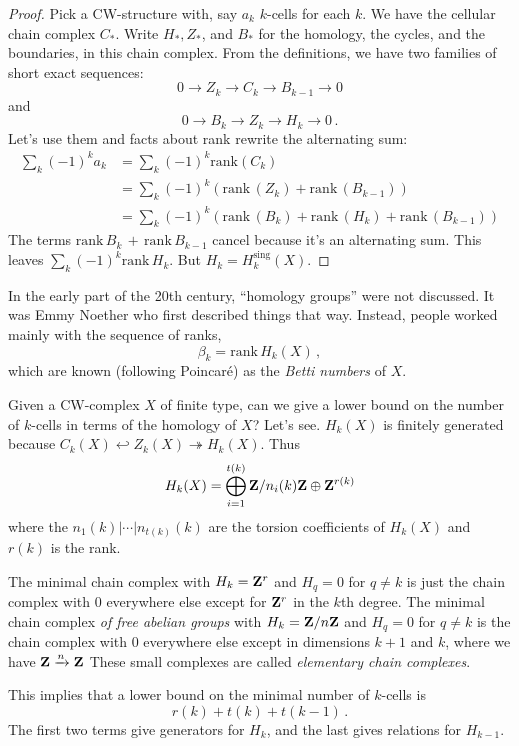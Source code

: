 \begin{proof}
Pick a CW-structure with, say $a_k$ $k$-cells for each $k$. We have the 
cellular chain complex $C_*$. Write $H_*,Z_*$, and $B_*$ for the homology,
the cycles, and the boundaries, in this chain complex. From the definitions, 
we have two families of short exact sequences: 
\[
0\to Z_k\to C_k\to B_{k-1}\to 0
\]
and
\[
0\to B_k\to Z_k\to H_k\to 0\,.
\]
Let's use them and facts about rank rewrite the alternating sum:
\begin{align*}
\sum_k (-1)^ka_k & = \sum_k(-1)^k\mathrm{rank}(C_k)\\
& = \sum_k(-1)^k(\mathrm{rank}\,(Z_k)+\mathrm{rank}\,(B_{k-1}))\\
& = \sum_k(-1)^k(\mathrm{rank}\,(B_k)+\mathrm{rank}\,(H_k)+
\mathrm{rank}\,(B_{k-1}))
\end{align*}
The terms $\mathrm{rank}\,B_k\,+\,\mathrm{rank}\,B_{k-1}$ cancel because it's an alternating sum. This leaves $\sum_k(-1)^k\mathrm{rank}\,H_k$. But $H_k= H_k^\text{sing}(X)$.
\end{proof}

In the early part of the 20th century, ``homology groups'' were not discussed. 
It was Emmy Noether who first described things that way. Instead, 
people worked mainly with the sequence of ranks, 
\[
\beta_k=\mathrm{rank}\,H_k(X)\,,
\]
which are known (following Poincar\'e) as the {\em Betti numbers} of $X$.

Given a CW-complex $X$ of finite type, can we give a lower bound on the number of $k$-cells in terms of the homology of $X$? Let's see. $H_k(X)$ is finitely generated because $C_k(X)\hookleftarrow Z_k(X)\twoheadrightarrow H_k(X)$. Thus 
\[
H_k(X)=\bigoplus^{t(k)}_{i=1}\mathbf Z/n_i(k)\mathbf Z\oplus \mathbf Z^{r(k)}
\]
where the $n_1(k)|\cdots|n_{t(k)}(k)$ are the torsion coefficients of $H_k(X)$ 
and $r(k)$ is the rank.

The minimal chain complex with $H_k=\mathbf Z^r$ and $H_q=0$ for $q\neq k$ is just the chain complex with $0$ everywhere else except for $\mathbf Z^r$ in the $k$th degree. The minimal chain complex {\em of free abelian groups} with $ H_k=\mathbf Z/n\mathbf Z$ and $ H_q=0$ for $q\neq k$ is the chain complex with $0$ everywhere else except in dimensions $k+1$ and $k$, where we have $\mathbf Z\xrightarrow{n}\mathbf Z$ 
These small complexes are called {\em elementary chain complexes}.

This implies that
a lower bound on the minimal number of $k$-cells is 
\[
r(k)+t(k)+t(k-1)\,.
\]
The first two terms give generators for $H_k$, and the last gives relations
for $H_{k-1}$.

